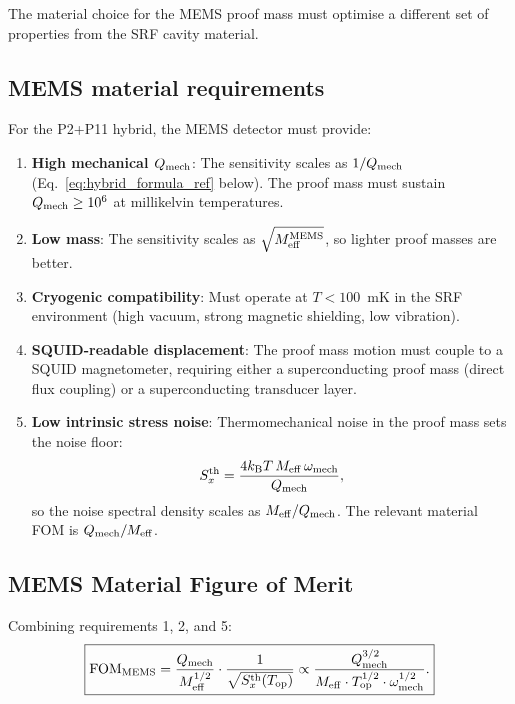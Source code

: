 \documentclass[11pt]{article}
\theoremstyle{definition}
\theoremstyle{remark}
\newcommand{\Meff}{M_{\rm eff}}
\newcommand{\FOMMEMS}{\mathrm{FOM}_{\rm MEMS}}
\begin{document}
The material choice for the MEMS proof mass must optimise a different
set of properties from the SRF cavity material.

\subsection{MEMS material requirements}

For the P2+P11 hybrid, the MEMS detector must provide:

\begin{enumerate}
  \item \textbf{High mechanical $Q_{\rm mech}$}: The sensitivity scales
    as $1/Q_{\rm mech}$ (Eq.~\ref{eq:hybrid_formula_ref} below). The
    proof mass must sustain $Q_{\rm mech} \geq 10^6$ at millikelvin
    temperatures.

  \item \textbf{Low mass}: The sensitivity scales as $\sqrt{\Meff^{\rm MEMS}}$,
    so lighter proof masses are better.

  \item \textbf{Cryogenic compatibility}: Must operate at $T < 100$~mK
    in the SRF environment (high vacuum, strong magnetic shielding,
    low vibration).

  \item \textbf{SQUID-readable displacement}: The proof mass motion must
    couple to a SQUID magnetometer, requiring either a superconducting
    proof mass (direct flux coupling) or a superconducting transducer
    layer.

  \item \textbf{Low intrinsic stress noise}: Thermomechanical noise
    in the proof mass sets the noise floor:
    \begin{equation}
      S_x^{\rm th} = \frac{4k_{\rm B}T\,\Meff\,\omega_{\rm mech}}{Q_{\rm mech}},
    \end{equation}
    so the noise spectral density scales as $\Meff/Q_{\rm mech}$. The
    relevant material FOM is $Q_{\rm mech}/\Meff$.
\end{enumerate}

\subsection{MEMS Material Figure of Merit}

Combining requirements 1, 2, and 5:
\begin{equation}
\boxed{
  \FOMMEMS = \frac{Q_{\rm mech}}{\Meff^{1/2}}
  \cdot \frac{1}{\sqrt{S_x^{\rm th}(T_{\rm op})}}
  \propto \frac{Q_{\rm mech}^{3/2}}{\Meff \cdot T_{\rm op}^{1/2}
  \cdot \omega_{\rm mech}^{1/2}}.
}
\label{eq:FOM_MEMS}
\end{equation}
\end{document}
